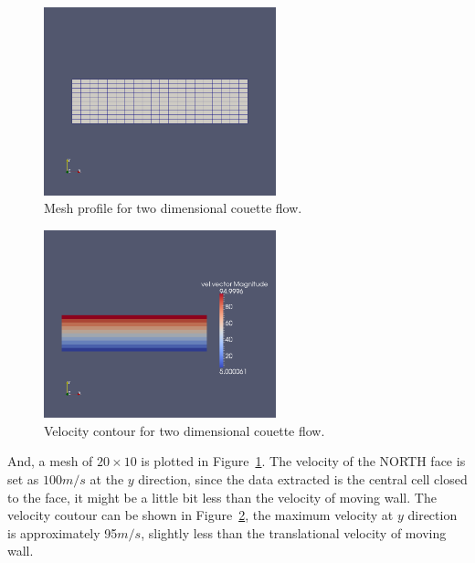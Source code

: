 \begin{figure}[htbp]
\begin{center}
\includegraphics[width=0.6\textwidth]{../2D/couette-flow/c_2D_mesh.png}
\end{center}
\caption{Mesh profile for two dimensional couette flow.}
   \label{couette-mesh-fig}
\end{figure}

\begin{figure}[htbp]
\begin{center}
\includegraphics[width=0.6\textwidth]{../2D/couette-flow/c_2D_velocity_counter.png}
\end{center}
\caption{Velocity contour for two dimensional couette flow.}
   \label{couette-velocity-fig}
\end{figure}

\medskip
And, a mesh of $20 \times 10$ is plotted in Figure~\ref{couette-mesh-fig}. The velocity of the NORTH face is set as $100 m/s$
at the $y$ direction, since the data extracted is the central cell closed to the face, it might be a little bit less than the velocity 
of moving wall. The velocity coutour can be shown in Figure~\ref{couette-velocity-fig}, the maximum velocity at $y$ direction 
is approximately 95$m/s$, slightly less than the translational velocity of moving wall.

